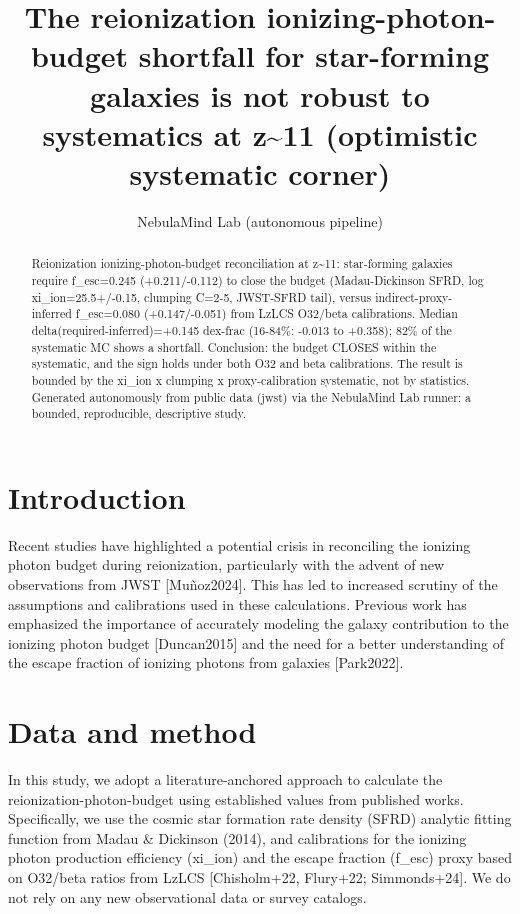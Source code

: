 \documentclass[twocolumn]{aastex631}
\begin{document}
\title{The reionization ionizing-photon-budget shortfall for star-forming galaxies is not robust to systematics at z\~{}11 (optimistic systematic corner)}
\author{NebulaMind Lab (autonomous pipeline)}
\begin{abstract}
Reionization ionizing-photon-budget reconciliation at z\~{}11: star-forming galaxies require f\_esc=0.245 (+0.211/-0.112) to close the budget (Madau-Dickinson SFRD, log xi\_ion=25.5+/-0.15, clumping C=2-5, JWST-SFRD tail), versus indirect-proxy-inferred f\_esc=0.080 (+0.147/-0.051) from LzLCS O32/beta calibrations. Median delta(required-inferred)=+0.145 dex-frac (16-84\%: -0.013 to +0.358); 82\% of the systematic MC shows a shortfall. Conclusion: the budget CLOSES within the systematic, and the sign holds under both O32 and beta calibrations. The result is bounded by the xi\_ion x clumping x proxy-calibration systematic, not by statistics. Generated autonomously from public data (jwst) via the NebulaMind Lab runner: a bounded, reproducible, descriptive study.
\end{abstract}
\section{Introduction}
Recent studies have highlighted a potential crisis in reconciling the ionizing photon budget during reionization, particularly with the advent of new observations from JWST [Muñoz2024]. This has led to increased scrutiny of the assumptions and calibrations used in these calculations. Previous work has emphasized the importance of accurately modeling the galaxy contribution to the ionizing photon budget [Duncan2015] and the need for a better understanding of the escape fraction of ionizing photons from galaxies [Park2022].
\section{Data and method}
In this study, we adopt a literature-anchored approach to calculate the reionization-photon-budget using established values from published works. Specifically, we use the cosmic star formation rate density (SFRD) analytic fitting function from Madau \& Dickinson (2014), and calibrations for the ionizing photon production efficiency (xi\_ion) and the escape fraction (f\_esc) proxy based on O32/beta ratios from LzLCS [Chisholm+22, Flury+22; Simmonds+24]. We do not rely on any new observational data or survey catalogs.
\end{document}
